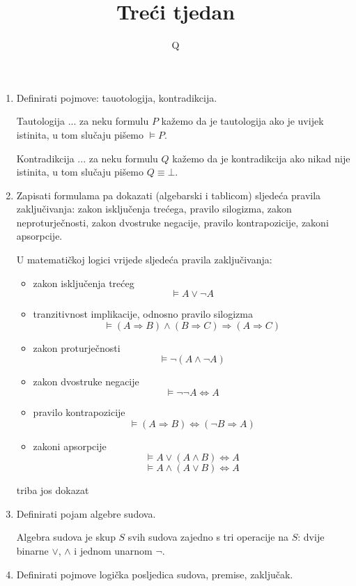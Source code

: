 \documentclass{article}
\title{\textbf{Treći tjedan}}
\author{Q}
\date{}
\begin{document}
\pagecolor{black}
\color{white}
\maketitle

\begin{enumerate}

\item Definirati pojmove: tauotologija, kontradikcija.

Tautologija ... za neku formulu $P$ kažemo da je tautologija ako je uvijek istinita, u tom slučaju pišemo $\vDash P$.

Kontradikcija ... za neku formulu $Q$ kažemo da je kontradikcija ako nikad nije istinita, u tom slučaju pišemo $Q\equiv\bot$.

\item Zapisati formulama pa dokazati (algebarski i tablicom) sljedeća pravila zaključivanja: zakon isključenja trećega, pravilo silogizma, zakon neproturječnosti, zakon dvostruke negacije, pravilo kontrapozicije, zakoni apsorpcije.

U matematičkoj logici vrijede sljedeća pravila zaključivanja:
\begin{itemize}
\item zakon isključenja trećeg
$$\vDash A\lor\neg A$$
\item tranzitivnost implikacije, odnosno pravilo silogizma
$$\vDash ( A\Rightarrow B)\land(B\Rightarrow C)\Rightarrow(A\Rightarrow C)$$
\item zakon proturječnosti
$$\vDash \neg( A\land\neg A)$$
\item zakon dvostruke negacije
$$\vDash \neg\neg A\Leftrightarrow A$$
\item pravilo kontrapozicije
$$\vDash(A\Rightarrow B)\Leftrightarrow(\neg B\Rightarrow A)$$
\item zakoni apsorpcije
$$\vDash A\lor(A\land B)\Leftrightarrow A$$
$$\vDash A\land(A\lor B)\Leftrightarrow A$$
\end{itemize}

\color{carminered}
triba jos dokazat
\color{white}

\item Definirati pojam algebre sudova.

Algebra sudova je skup $S$ svih sudova zajedno s tri operacije na $S$: dvije binarne $\lor$, $\land$ i jednom unarnom $\neg$.

\item Definirati pojmove logička posljedica sudova, premise, zaključak.


\end{enumerate}
\end{document}

